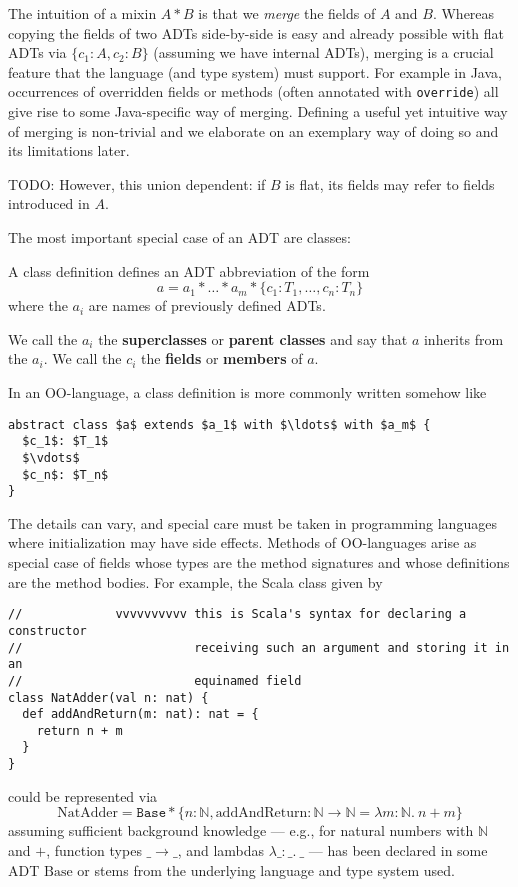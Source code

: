 The intuition of a mixin $A*B$ is that we \emph{merge} the fields of $A$ and $B$.
Whereas copying the fields of two ADTs side-by-side is easy and already possible with flat ADTs via $\{c_1: A, c_2: B\}$ (assuming we have internal ADTs), merging is a crucial feature that the language (and type system) must support.
For example in Java, occurrences of overridden fields or methods (often annotated with \texttt{override}) all give rise to some Java-specific way of merging.
Defining a useful yet intuitive way of merging is non-trivial and we elaborate on an exemplary way of doing so and its limitations later.

TODO: However, this union dependent: if $B$ is flat, its fields may refer to fields introduced in $A$.

The most important special case of an ADT are classes:

\begin{definition}[Class]
A class definition defines an ADT abbreviation of the form
\[a = a_1*\ldots*a_m*\{c_1:T_1,\ldots,c_n:T_n\}\]
where the $a_i$ are names of previously defined ADTs.

We call the $a_i$ the \textbf{superclasses} or \textbf{parent classes} and say that $a$ inherits from the $a_i$.
We call the $c_i$ the \textbf{fields} or \textbf{members} of $a$.
\end{definition}

In an OO-language, a class definition is more commonly written somehow like
\begin{lstlisting}
abstract class $a$ extends $a_1$ with $\ldots$ with $a_m$ {
  $c_1$: $T_1$
  $\vdots$
  $c_n$: $T_n$
}
\end{lstlisting}
The details can vary, and special care must be taken in programming languages where initialization may have side effects.
Methods of OO-languages arise as special case of fields whose types are the method signatures and whose definitions are the method bodies.
For example, the Scala class given by
\begin{lstlisting}
//             vvvvvvvvvv this is Scala's syntax for declaring a constructor
//                        receiving such an argument and storing it in an
//                        equinamed field
class NatAdder(val n: nat) {
  def addAndReturn(m: nat): nat = {
    return n + m
  }
}
\end{lstlisting}
could be represented via \[
  \text{NatAdder} = \texttt{Base} \ast \{n: \mathbb{N}, \text{addAndReturn}: \mathbb{N} \rightarrow \mathbb{N} = \lambda m:\mathbb{N}.\ n + m\}
\]
assuming sufficient background knowledge --- e.g., for natural numbers with $\mathbb{N}$ and $+$, function types $\_ \rightarrow \_$, and lambdas $\lambda \_:\_.\ \_$ --- has been declared in some ADT $\text{Base}$ or stems from the underlying  language and type system used.

